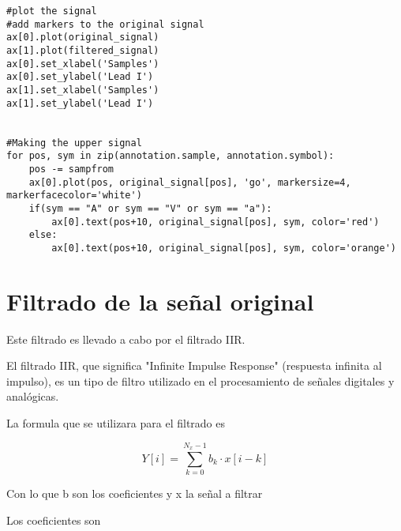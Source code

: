\lstset{language=python, breaklines=true, basicstyle=\footnotesize}
\begin{lstlisting}[frame=single]
#plot the signal
#add markers to the original signal
ax[0].plot(original_signal)
ax[1].plot(filtered_signal)
ax[0].set_xlabel('Samples')
ax[0].set_ylabel('Lead I')
ax[1].set_xlabel('Samples')
ax[1].set_ylabel('Lead I')


#Making the upper signal
for pos, sym in zip(annotation.sample, annotation.symbol):
    pos -= sampfrom
    ax[0].plot(pos, original_signal[pos], 'go', markersize=4, markerfacecolor='white')
    if(sym == "A" or sym == "V" or sym == "a"):
        ax[0].text(pos+10, original_signal[pos], sym, color='red')
    else:
        ax[0].text(pos+10, original_signal[pos], sym, color='orange')
\end{lstlisting}

\section{Filtrado de la señal original}
Este filtrado es llevado a cabo por el filtrado IIR.

El filtrado IIR, que significa "Infinite Impulse Response" (respuesta infinita al impulso),
es un tipo de filtro utilizado en el procesamiento de señales digitales y analógicas.

La formula que se utilizara para el filtrado es

\[ Y[i] = \sum_{k=0}^{N_x -1} b_k \cdot x[i-k] \]

Con lo que b son los coeficientes y x la señal a filtrar

Los coeficientes son 

